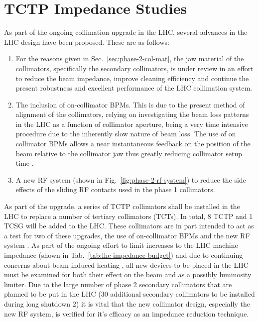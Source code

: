 \section{TCTP Impedance Studies}
\label{sec:tctp}

As part of the ongoing collimation upgrade in the LHC, several advances in the LHC design have been proposed. These are as follows:

\begin{enumerate}
\item{For the reasons given in Sec.~\ref{sec:phase-2-col-mat}, the jaw material of the collimators, specifically the secondary collimators, is under review in an effort to reduce the beam impedance, improve cleaning efficiency and continue the present robustness and excellent performance of the LHC collimation system.}
\item{The inclusion of on-collimator BPMs. This is due to the present method of alignment of the collimators, relying on investigating the beam loss patterns in the LHC as a function of collimator aperture, being a very time intensive procedure due to the inherently slow nature of beam loss. The use of on collimator BPMs allows a near instantaneous feedback on the position of the beam relative to the collimator jaw thus greatly reducing collimator setup time \cite{Valentino:ColAlignment, Valentino:BPM}.}
\item{A new RF system (shown in Fig.~\ref{fig:phase-2-rf-system}) to reduce the side effects of the sliding RF contacts used in the phase 1 collimators.}
\end{enumerate}

As part of the upgrade, a series of TCTP collimators shall be installed in the LHC to replace a number of tertiary collimators (TCTs). In total, 8 TCTP and 1 TCSG will be added to the LHC. These collimators are in part intended to act as a test for two of these upgrades, the use of on-collimator BPMs and the new RF system \cite{Dallocchio:ColBPM}. As part of the ongoing effort to limit increases to the LHC machine impedance (shown in Tab.~\ref{tab:lhc-impedance-budget}) and due to continuing concerns about beam-induced heating \cite{Salvant:Heating, Metral:Heating}, all new devices to be placed in the LHC must be examined for both their effect on the beam and as a possibly luminosity limiter. Due to the large number of phase 2 secondary collimators that are planned to be put in the LHC (30 additional secondary collimators to be installed during long shutdown 2) it is vital that the new collimator design, especially the new RF system, is verified for it's efficacy as an impedance reduction technique.  

